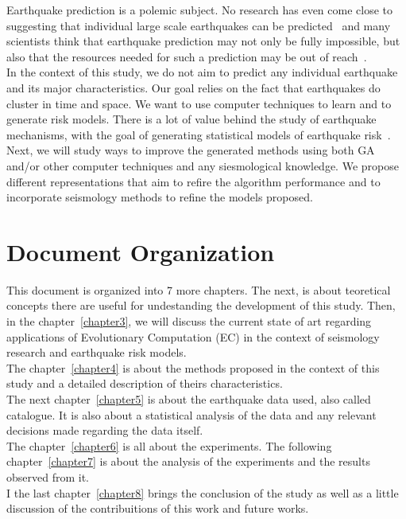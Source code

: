 Earthquake prediction is a polemic subject. No research has even come close to suggesting that individual large scale earthquakes can be predicted~\cite{ecta14} and many scientists think that earthquake prediction may not only be fully impossible, but also that the resources needed for such a prediction may be out of reach~\cite{eberhard2014multiscale}.\\

In the context of this study, we do not aim to predict any individual earthquake and its major characteristics. Our goal relies on the fact that earthquakes do cluster in time and space. We want to use computer techniques to learn and to generate risk models. There is a lot of value behind the study of earthquake mechanisms, with the goal of generating statistical models of earthquake risk~\cite{Nature1999}.\\

Next, we will study ways to improve the generated methods using both GA and/or other computer techniques and any siesmological knowledge. We propose different representations that aim to refire the algorithm performance and to incorporate seismology methods to refine the models proposed.\\

\section{Document Organization}

This document is organized into 7 more chapters. The next, is about teoretical concepts there are useful for undestanding the development of this study. Then, in the chapter~\ref{chapter3}, we will discuss the current state of art regarding applications of Evolutionary Computation (EC) in the context of seismology research and earthquake risk models. \\


The chapter~\ref{chapter4} is about the methods proposed in the context of this study and a detailed description of theirs characteristics.\\

The next chapter~\ref{chapter5} is about the earthquake data used, also called catalogue. It is also about a statistical analysis of the data and any relevant decisions made regarding the data itself.\\

The chapter~\ref{chapter6} is all about the experiments. The following chapter~\ref{chapter7} is about the analysis of the experiments and the results observed from it.\\

I the last chapter~\ref{chapter8} brings the conclusion of the study as well as a little discussion of the contribuitions of this work and future works.\\


